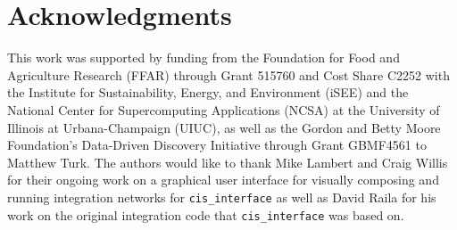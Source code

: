 \documentclass[journal]{IEEEtran}
\newcommand{\todo}[1]{{\color{red}{#1}}}
\newcommand{\cis}{{\tt cis\_interface}{}}
\begin{document}
\section*{Acknowledgments}
\ifieee
\else
\acknowledgments
\fi
%
This work was supported by funding from the Foundation for Food and Agriculture Research (FFAR) through Grant 515760 and Cost Share C2252 with the Institute for Sustainability, Energy, and Environment (iSEE) and the National Center for Supercomputing Applications (NCSA) at the University of Illinois at Urbana-Champaign (UIUC), as well as the Gordon and Betty Moore Foundation's Data-Driven Discovery Initiative through Grant GBMF4561 to Matthew Turk. 
%
The authors would like to thank Mike Lambert and Craig Willis for their ongoing work on a graphical user interface for visually composing and running integration networks for {\cis} as well as David Raila for his work on the original integration code that {\cis} was based on.

\ifdraft
	
\else
	
\fi

\ifplacefig
\else
\fi

\end{document}
